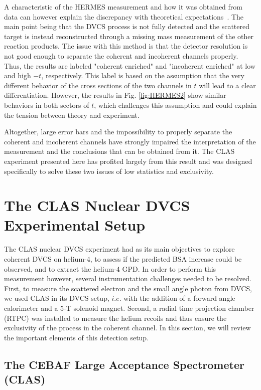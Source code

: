 \documentclass[aps,prc,preprint,superscriptaddress]{revtex4}
\begin{document}
A characteristic of the HERMES measurement and how it was obtained from data can however
explain the discrepancy with theoretical expectations~\cite{Guzey:2003jh,Airapetian:2009cga}.
The main point being that the DVCS process is not fully detected and the scattered target
is instead reconstructed through a missing mass measurement of the other reaction products. The 
issue with this method is that the detector resolution is not good enough to separate the 
coherent and incoherent channels properly. 
Thus, the results are labeled "coherent enriched" and "incoherent enriched" at low and high 
$-t$, respectively. This label is based on the assumption that the very different behavior of the
cross sections of the two channels in $t$ will lead to a clear differentiation. However, the
results in Fig. \ref{fig:HERMES2} show similar behaviors in both sectors of $t$, which  
challenges this assumption and could explain the tension between theory and experiment. 

Altogether, large error bars and the impossibility to properly separate the coherent and 
incoherent channels have strongly impaired the interpretation of the measurement 
and the conclusions that can be
obtained from it. The CLAS experiment presented here has profited largely from this
result and was designed specifically to solve these two issues of low statistics and exclusivity.

\section{The CLAS Nuclear DVCS Experimental Setup}

The CLAS nuclear DVCS experiment had as its main objectives to explore coherent DVCS on helium-4, to assess if
the predicted BSA increase could be observed, and to extract the helium-4 GPD. In order to
perform this measurement however, several instrumentation challenges needed to be resolved. First, to
measure the scattered electron and the small angle photon from DVCS, we used CLAS in its 
DVCS setup, $i.e.$ with the addition of a forward angle calorimeter and a 5-T solenoid magnet. Second, a
radial time projection chamber (RTPC) was installed to measure the
helium recoils and thus ensure the exclusivity of the process in the coherent channel. In this section, we 
will review the important elements of this detection setup. 

\subsection{The CEBAF Large Acceptance Spectrometer (CLAS)}
\end{document}
